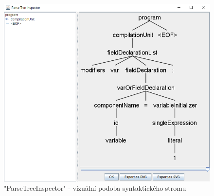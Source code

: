\begin{figure}
	\centering
	\includegraphics[scale=0.8]{images/ParseTreeInspector}
	\caption{"ParseTreeInspector" - vizuální podoba syntaktického stromu} 
	\label{img:ParseTreeInspector}
\end{figure}

\endinput